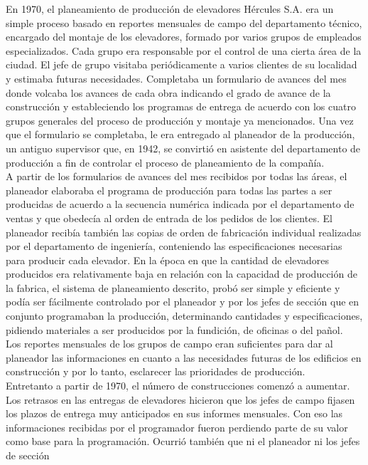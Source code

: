 \documentclass[a4paper,10pt]{article}
\begin{document}
En 1970, el planeamiento de producción de elevadores Hércules S.A. era un simple
proceso basado en reportes mensuales de campo del departamento técnico, encargado
del montaje de los elevadores, formado por varios grupos de empleados especializados.
Cada grupo era responsable por el control de una cierta área de la ciudad. El jefe de
grupo visitaba periódicamente a varios clientes de su localidad y estimaba futuras
necesidades. Completaba un formulario de avances del mes donde volcaba los avances
de cada obra indicando el grado de avance de la construcción y estableciendo los
programas de entrega de acuerdo con los cuatro grupos generales del proceso de
producción y montaje ya mencionados. Una vez que el formulario se completaba, le era
entregado al planeador de la producción, un antiguo supervisor que, en 1942, se convirtió
en asistente del departamento de producción a fin de controlar el proceso de
planeamiento de la compañía.\\
A partir de los formularios de avances del mes recibidos por todas las áreas, el
planeador elaboraba el programa de producción para todas las partes a ser producidas
de acuerdo a la secuencia numérica indicada por el departamento de ventas y que
obedecía al orden de entrada de los pedidos de los clientes. El planeador recibía
también las copias de orden de fabricación individual realizadas por el departamento
de ingeniería, conteniendo las especificaciones necesarias para producir cada elevador.
En la época en que la cantidad de elevadores producidos era relativamente baja en
relación con la capacidad de producción de la fabrica, el sistema de planeamiento
descrito, probó ser simple y eficiente y podía ser fácilmente controlado por el planeador
y por los jefes de sección que en conjunto programaban la producción, determinando
cantidades y especificaciones, pidiendo materiales a ser producidos por la fundición, de
oficinas o del pañol.\\
Los reportes mensuales de los grupos de campo eran suficientes para dar al planeador
las informaciones en cuanto a las necesidades futuras de los edificios en construcción y
por lo tanto, esclarecer las prioridades de producción.\\
Entretanto a partir de 1970, el número de construcciones comenzó a aumentar. Los
retrasos en las entregas de elevadores hicieron que los jefes de campo fijasen los
plazos de entrega muy anticipados en sus informes mensuales. Con eso las
informaciones recibidas por el programador fueron perdiendo parte de su valor como
base para la programación. Ocurrió también que ni el planeador ni los jefes de sección
\end{document}
